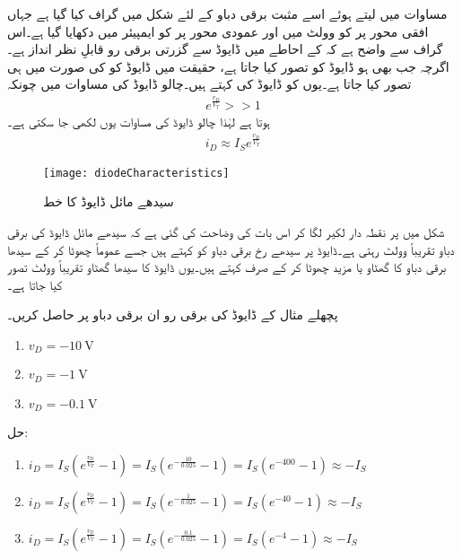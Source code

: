 مساوات   میں  لیتے ہوئے اسے مثبت برقی دباو کے لئے  شکل  میں گراف کیا گیا ہے جہاں افقی محور پر  کو وولٹ میں اور عمودی محور پر  کو ایمپیئر میں دکھایا گیا ہے۔اس گراف سے واضح ہے کہ   کے احاطے میں ڈایوڈ سے گزرتی برقی رو قابلِ نظر انداز ہے۔اگرچہ جب بھی   ہو ڈایوڈ کو  تصور کیا جاتا ہے، حقیقت میں ڈایوڈ کو کی صورت میں ہی  تصور کیا جاتا ہے۔یوں  کو ڈایوڈ  کی   کہتے ہیں۔چالو ڈایوڈ کی مساوات میں چونکہ 
\begin{align*}
e^{\frac{v_D}{V_T}}>>1
\end{align*}
ہوتا ہے لہٰذا چالو ڈایوڈ کی مساوات یوں لکھی جا سکتی ہے۔
\begin{align} \label{مساوات_چالو_ڈایوڈ}
i_D \approx I_S e^{\frac{v_D}{V_T}}
\end{align}
%
\begin{figure}
\centering
\texttt{[image: diodeCharacteristics]}
\caption{سیدھے مائل ڈایوڈ کا خط}
\label{شکل_ڈایوڈ_کا_خط}
\end{figure} 
شکل  میں  پر نقطہ دار لکیر لگا کر اس بات کی وضاحت کی گئی ہے کہ سیدھے مائل ڈایوڈ کی برقی دباو   تقریباً  وولٹ رہتی ہے۔ڈایوڈ پر سیدھے رخ برقی دباو کو   کہتے ہیں جسے عموماً چھوٹا کر کے سیدھا برقی دباو کا گھٹاو یا مزید چھوٹا کر کے صرف  کہتے ہیں۔یوں ڈایوڈ کا سیدھا گھٹاو تقریباً وولٹ تصور کیا جاتا ہے۔

پچھلے مثال کے  ڈایوڈ کی برقی رو   ان برقی دباو پر حاصل کریں۔
\begin{enumerate}
\item
$v_D=\SI{-10}{\volt}$
\item
$v_D=\SI{-1}{\volt}$
\item
$v_D=\SI{-0.1}{\volt}$
\end{enumerate}

حل:
\begin{enumerate}
\item
$
i_D=I_S \left (e^{\frac{v_D}{V_T}}-1 \right )=I_S \left (e^{-\frac{10}{0.025}} -1\right )=I_S \left(e^{-400}-1 \right ) \approx -I_S
$
\item
$
i_D=I_S \left (e^{\frac{v_D}{V_T}}-1 \right )=I_S \left (e^{-\frac{1}{0.025}} -1\right ) =I_S \left (e^{-40}-1 \right ) \approx -I_S
$
\item
$
i_D=I_S \left (e^{\frac{v_D}{V_T}}-1 \right )=I_S \left (e^{-\frac{0.1}{0.025}}-1 \right ) =I_S \left (e^{-4}-1 \right ) \approx -I_S
$
\end{enumerate}


